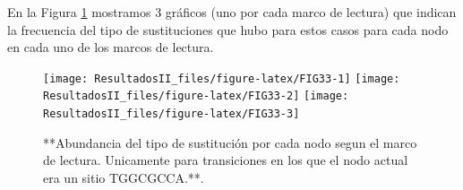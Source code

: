 \documentclass[
]{book}
\begin{document}
En la Figura \ref{fig:FIG33} mostramos 3 gráficos (uno por cada marco de lectura) que indican la frecuencia del tipo de sustituciones que hubo para estos casos para cada nodo en cada uno de los marcos de lectura.

\begin{figure}

{\centering \texttt{[image: ResultadosII\_files/figure-latex/FIG33-1]} \texttt{[image: ResultadosII\_files/figure-latex/FIG33-2]} \texttt{[image: ResultadosII\_files/figure-latex/FIG33-3]} 

}

\caption{**Abundancia del tipo de sustitución por cada nodo segun el marco de lectura. Unicamente para transiciones en los que el nodo actual era un sitio TGGCGCCA.**.}\label{fig:FIG33}
\end{figure}

  
\end{document}
